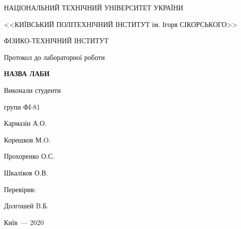 \thispagestyle{empty}

\begin{center}
НАЦІОНАЛЬНИЙ ТЕХНІЧНИЙ УНІВЕРСИТЕТ УКРАЇНИ \par
<<КИЇВСЬКИЙ ПОЛІТЕХНІЧНИЙ ІНСТИТУТ ім. Ігоря СІКОРСЬКОГО>>\par
ФІЗИКО-ТЕХНІЧНИЙ ІНСТИТУТ\par

\vspace{5cm}
{\huge Протокол до лабораторної роботи \par}

\huge\MakeUppercase{\textbf{ Назва лаби }} \par
\end{center}

\vspace{3cm}
\begin{flushright}
Виконали студенти 

групи ФІ-81

\bigbreak

Кармазін А.О.

Корешков М.O.

Прохоренко О.С.

Шкаліков О.В.

\vspace{20mm}
Перевірив:

Долгошей B.Б.

\end{flushright}

\vspace{6cm}
\begin{center}
{Київ~--- 2020}
\end{center}

\newpage
